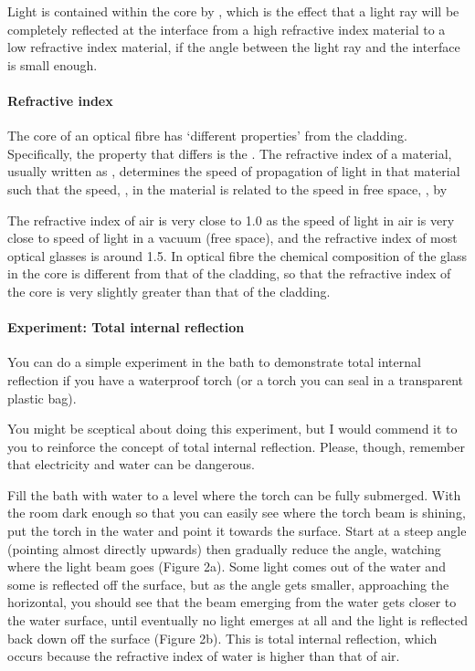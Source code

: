 \documentclass[letterpaper,10pt,english]{sphinxmanual}
\let\sphinxpxdimen\pdfpxdimen\else\newdimen\sphinxpxdimen
\begin{document}
Light is contained within the core by , which is the effect that a light ray will be completely reflected at the interface from a high refractive index material to a low refractive index material, if the angle between the light ray and the interface is small enough.


\paragraph{Refractive index}
\label{\detokenize{content/session_00/Part_00_02:Refractive-index}}
The core of an optical fibre has ‘different properties’ from the cladding. Specifically, the property that differs is the . The refractive index of a material, usually written as , determines the speed of propagation of light in that material such that the speed, , in the material is related to the speed in free space, , by

\sphinxincludegraphics[width=511\sphinxpxdimen,height=551\sphinxpxdimen]{{t305_ue011i}.gif}

The refractive index of air is very close to 1.0 as the speed of light in air is very close to speed of light in a vacuum (free space), and the refractive index of most optical glasses is around 1.5. In optical fibre the chemical composition of the glass in the core is different from that of the cladding, so that the refractive index of the core is very slightly greater than that of the cladding.


\paragraph{Experiment: Total internal reflection}
\label{\detokenize{content/session_00/Part_00_02:Experiment:-Total-internal-reflection}}
You can do a simple experiment in the bath to demonstrate total internal reflection if you have a waterproof torch (or a torch you can seal in a transparent plastic bag).

You might be sceptical about doing this experiment, but I would commend it to you to reinforce the concept of total internal reflection. Please, though, remember that electricity and water can be dangerous. 

Fill the bath with water to a level where the torch can be fully submerged. With the room dark enough so that you can easily see where the torch beam is shining, put the torch in the water and point it towards the surface. Start at a steep angle (pointing almost directly upwards) then gradually reduce the angle, watching where the light beam goes (Figure 2a). Some light comes out of the water and some is reflected off the surface, but as the angle gets smaller, approaching the horizontal, you
should see that the beam emerging from the water gets closer to the water surface, until eventually no light emerges at all and  the light is reflected back down off the surface (Figure 2b). This is total internal reflection, which occurs because the refractive index of water is higher than that of air.
\end{document}
